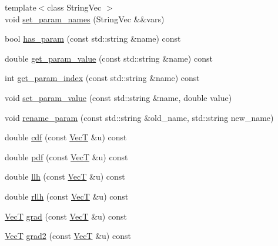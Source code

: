 \begin{DoxyCompactItemize}
{\footnotesize template$<$class String\+Vec $>$ }\\void \hyperlink{classprior__hessian_1_1CompositeDist_a38c4fdacf927824117d202422b04013c}{set\+\_\+param\+\_\+names} (String\+Vec \&\&vars)
\item 
bool \hyperlink{classprior__hessian_1_1CompositeDist_a6216610bfbcc92a40c7fa43ae60bd5af}{has\+\_\+param} (const std\+::string \&name) const 
\item 
double \hyperlink{classprior__hessian_1_1CompositeDist_a25183fbeb28704eca9f7fe31dccb7640}{get\+\_\+param\+\_\+value} (const std\+::string \&name) const 
\item 
int \hyperlink{classprior__hessian_1_1CompositeDist_af8d9b349da5f5842e04f0ca7443c7363}{get\+\_\+param\+\_\+index} (const std\+::string \&name) const 
\item 
void \hyperlink{classprior__hessian_1_1CompositeDist_a2b9cc7f1661dbd1bbd6f37c462781d5f}{set\+\_\+param\+\_\+value} (const std\+::string \&name, double value)
\item 
void \hyperlink{classprior__hessian_1_1CompositeDist_ace0aaa3698d76aba6a47f9061ff98902}{rename\+\_\+param} (const std\+::string \&old\+\_\+name, std\+::string new\+\_\+name)
\item 
double \hyperlink{classprior__hessian_1_1CompositeDist_a7e3a117e6140580cb93e359a92506678}{cdf} (const \hyperlink{namespaceprior__hessian_a0b42fc70dec525d83fb2ac155d9ab974}{VecT} \&u) const 
\item 
double \hyperlink{classprior__hessian_1_1CompositeDist_abbde55c133989f566801967484ccb2b8}{pdf} (const \hyperlink{namespaceprior__hessian_a0b42fc70dec525d83fb2ac155d9ab974}{VecT} \&u) const 
\item 
double \hyperlink{classprior__hessian_1_1CompositeDist_ad1192b84b64c7f43fc5623bb1a121833}{llh} (const \hyperlink{namespaceprior__hessian_a0b42fc70dec525d83fb2ac155d9ab974}{VecT} \&u) const 
\item 
double \hyperlink{classprior__hessian_1_1CompositeDist_ae7186f83597ca44698b178cef6144f78}{rllh} (const \hyperlink{namespaceprior__hessian_a0b42fc70dec525d83fb2ac155d9ab974}{VecT} \&u) const 
\item 
\hyperlink{namespaceprior__hessian_a0b42fc70dec525d83fb2ac155d9ab974}{VecT} \hyperlink{classprior__hessian_1_1CompositeDist_aaa6bfd95f5914c0f68d67cd97ff40db3}{grad} (const \hyperlink{namespaceprior__hessian_a0b42fc70dec525d83fb2ac155d9ab974}{VecT} \&u) const 
\item 
\hyperlink{namespaceprior__hessian_a0b42fc70dec525d83fb2ac155d9ab974}{VecT} \hyperlink{classprior__hessian_1_1CompositeDist_a90a25995e3e72cc958f188c78fc76d92}{grad2} (const \hyperlink{namespaceprior__hessian_a0b42fc70dec525d83fb2ac155d9ab974}{VecT} \&u) const 

\end{DoxyCompactItemize}
